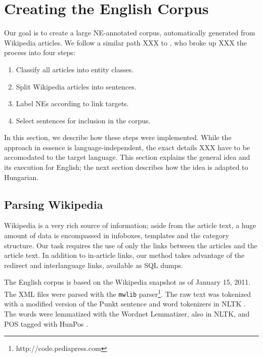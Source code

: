 \documentclass[11pt]{article}
\begin{document}
\section{Creating the English Corpus} 
\label{sec:create}

Our goal is to create a large NE-annotated corpus, automatically generated from Wikipedia articles. We follow a similar path XXX to \cite{Nothman:08}, who broke up XXX the process into four steps:

\begin{enumerate}
\item Classify all articles into entity classes.
\item Split Wikipedia articles into sentences.
\item Label NEs according to link targets.
\item Select sentences for inclusion in the corpus.
\end{enumerate}

In this section, we describe how these steps were implemented. While the approach in essence is language-independent, the exact details XXX have to be accomodated to the target language. This section explains the general idea and its execution for English; the next section describes how the idea is adapted to Hungarian.

\subsection{Parsing Wikipedia}

Wikipedia is a very rich source of information; aside from the article text, a huge amount of data is encompassed in infoboxes, templates and the category structure. Our task requires the use of only the links between the articles and the article text. In addition to in-article links, our method takes advantage of the redirect and interlanguage links, available as SQL dumps.

The English corpus is based on the Wikipedia snapshot as of January 15, 2011. The XML files were parsed with the \texttt{mwlib} parser\footnote{http://code.pediapress.com}. The raw text was tokenized with a modified version of the Punkt sentence and word tokenizers \cite{Kiss:06} in NLTK \cite{Loper:02}. The words were lemmatized with the Wordnet Lemmatizer, also in NLTK, and POS tagged with HunPos \cite{Halacsy:07}.

\end{document}
